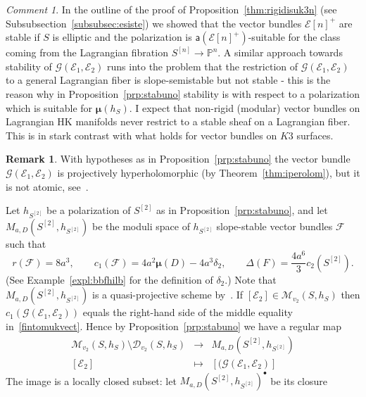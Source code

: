 \documentclass[11pt]{amsart}
\newcommand{\PP}{{\mathbb P}}
\let\mathcal\mathscr
\def\cD{\mathcal{D}}
\def\cE{\mathcal{E}}
\def\cF{\mathcal{F}}
\def\cG{\mathcal{G}}
\def\cM{\mathcal{M}}
\def\lra{\longrightarrow}
\theoremstyle{definition}
\newtheorem{rmk}[lmm]{Remark}
\theoremstyle{remark}
\newtheorem{cmm}[lmm]{Comment}
\begin{document}
%
%
\begin{cmm}
%
In the outline of the proof of Proposition~\ref{thm:rigidisuk3n} (see Subsubsection~\ref{subsubsec:esiste}) we showed that the vector bundles 
$\cE[n]^{+}$ are stable if $S$ is elliptic and the polarization is ${\mathsf a}(\cE[n]^{+})$-suitable for the class coming from the Lagrangian fibration $S^{[n]}\to\PP^n$. 
A similar approach towards stability of $\cG(\cE_1,\cE_2)$ runs into the problem that the restriction of $\cG(\cE_1,\cE_2)$ to a general Lagrangian fiber is slope-semistable but not stable - this is the reason why in Proposition~\ref{prp:stabuno} stability is with respect to a polarization which is suitable for $\bm{\mu}(h_S)$. I expect that non-rigid  (modular) vector bundles on Lagrangian HK manifolds never restrict  to a stable sheaf on a Lagrangian fiber. This is in stark contrast with what holds for vector bundles on $K3$ surfaces.
%
\end{cmm}
%
%
\begin{rmk}
%
With hypotheses as in Proposition~\ref{prp:stabuno}  the vector bundle $\cG(\cE_1,\cE_2)$ is projectively hyperholomorphic 
(by Theorem~\ref{thm:iperolom}), but it is not atomic, see~\cite[Prop.~4.1]{og:highdim}.
%
\end{rmk}
%
Let $ h_{S^{[2]}}$ be a polarization of $S^{[2]}$ as in Proposition~\ref{prp:stabuno}, and let $M_{a,D}(S^{[2]},h_{S^{[2]}})$ be the moduli space of 
 $ h_{S^{[2]}}$ slope-stable vector bundles $\cF$ such that
\begin{equation}\label{fintomukvect}
%
r(\cF) =8a^3,\qquad c_1(\cF)= 4a^2\bm{\mu}(D)-4a^3\delta_2, \qquad \Delta(F) =\frac{ 4a^6}{3} c_2(S^{[2]}).
%
\end{equation}
%
(See   Example~\ref{expl:bbfhilb} for the definition of  $\delta_2$.) Note that $M_{a,D}(S^{[2]},h_{S^{[2]}})$ is a quasi-projective scheme by~\cite{maruyama:fascilimitati}. If  $[\cE_2]\in\cM_{v_2}(S,h_S)$ then $c_1(\cG(\cE_1,\cE_2))$ equals 
the right-hand side of the middle equality in~\eqref{fintomukvect}. Hence by Proposition~\ref{prp:stabuno} we have a regular map
%
\begin{equation}\label{mappamod}
%
\begin{matrix}
%
\cM_{v_2}(S,h_S)\setminus \cD_{v_2}(S,h_S) & \lra & M_{a,D}(S^{[2]},h_{S^{[2]}}) \\
%
[\cE_2] & \mapsto & [(\cG(\cE_1,\cE_2)]
%
\end{matrix}
%
\end{equation}
%
The image is a locally closed subset: let $M_{a,D}(S^{[2]},h_{S^{[2]}})^{\bullet}$ be its closure
\end{document}
